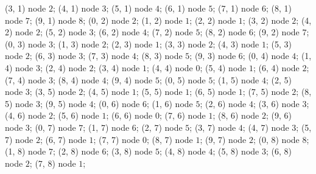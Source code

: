  (3, 1) node {\tiny $2$};
 (4, 1) node {\tiny $3$};
 (5, 1) node {\tiny $4$};
 (6, 1) node {\tiny $5$};
 (7, 1) node {\tiny $6$};
 (8, 1) node {\tiny $7$};
 (9, 1) node {\tiny $8$};
 (0, 2) node {\tiny $2$};
 (1, 2) node {\tiny $1$};
 (2, 2) node {\tiny $1$};
 (3, 2) node {\tiny $2$};
 (4, 2) node {\tiny $2$};
 (5, 2) node {\tiny $3$};
 (6, 2) node {\tiny $4$};
 (7, 2) node {\tiny $5$};
 (8, 2) node {\tiny $6$};
 (9, 2) node {\tiny $7$};
 (0, 3) node {\tiny $3$};
 (1, 3) node {\tiny $2$};
 (2, 3) node {\tiny $1$};
 (3, 3) node {\tiny $2$};
 (4, 3) node {\tiny $1$};
 (5, 3) node {\tiny $2$};
 (6, 3) node {\tiny $3$};
 (7, 3) node {\tiny $4$};
 (8, 3) node {\tiny $5$};
 (9, 3) node {\tiny $6$};
 (0, 4) node {\tiny $4$};
 (1, 4) node {\tiny $3$};
 (2, 4) node {\tiny $2$};
 (3, 4) node {\tiny $1$};
 (4, 4) node {\tiny $0$};
 (5, 4) node {\tiny $1$};
 (6, 4) node {\tiny $2$};
 (7, 4) node {\tiny $3$};
 (8, 4) node {\tiny $4$};
 (9, 4) node {\tiny $5$};
 (0, 5) node {\tiny $5$};
 (1, 5) node {\tiny $4$};
 (2, 5) node {\tiny $3$};
 (3, 5) node {\tiny $2$};
 (4, 5) node {\tiny $1$};
 (5, 5) node {\tiny $1$};
 (6, 5) node {\tiny $1$};
 (7, 5) node {\tiny $2$};
 (8, 5) node {\tiny $3$};
 (9, 5) node {\tiny $4$};
 (0, 6) node {\tiny $6$};
 (1, 6) node {\tiny $5$};
 (2, 6) node {\tiny $4$};
 (3, 6) node {\tiny $3$};
 (4, 6) node {\tiny $2$};
 (5, 6) node {\tiny $1$};
 (6, 6) node {\tiny $0$};
 (7, 6) node {\tiny $1$};
 (8, 6) node {\tiny $2$};
 (9, 6) node {\tiny $3$};
 (0, 7) node {\tiny $7$};
 (1, 7) node {\tiny $6$};
 (2, 7) node {\tiny $5$};
 (3, 7) node {\tiny $4$};
 (4, 7) node {\tiny $3$};
 (5, 7) node {\tiny $2$};
 (6, 7) node {\tiny $1$};
 (7, 7) node {\tiny $0$};
 (8, 7) node {\tiny $1$};
 (9, 7) node {\tiny $2$};
 (0, 8) node {\tiny $8$};
 (1, 8) node {\tiny $7$};
 (2, 8) node {\tiny $6$};
 (3, 8) node {\tiny $5$};
 (4, 8) node {\tiny $4$};
 (5, 8) node {\tiny $3$};
 (6, 8) node {\tiny $2$};
 (7, 8) node {\tiny $1$};
